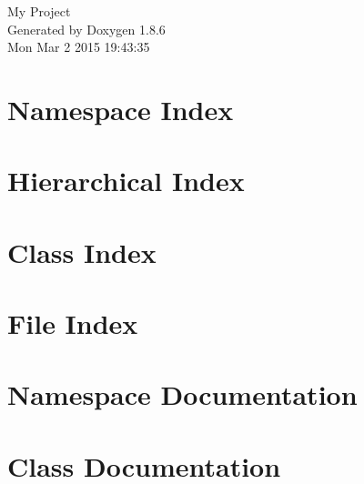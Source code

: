 \documentclass[twoside]{book}
\newcommand{\clearemptydoublepage}{%
  \newpage{\pagestyle{empty}\cleardoublepage}%
}
\begin{document}
\hypersetup{pageanchor=false}
\begin{titlepage}
\vspace*{7cm}
\begin{center}%
{\Large My Project }\\
\vspace*{1cm}
{\large Generated by Doxygen 1.8.6}\\
\vspace*{0.5cm}
{\small Mon Mar 2 2015 19:43:35}\\
\end{center}
\end{titlepage}
\clearemptydoublepage
\tableofcontents
\clearemptydoublepage
{}
\hypersetup{pageanchor=true}

\chapter{Namespace Index}

\chapter{Hierarchical Index}

\chapter{Class Index}

\chapter{File Index}

\chapter{Namespace Documentation}

\chapter{Class Documentation}




















\end{document}
